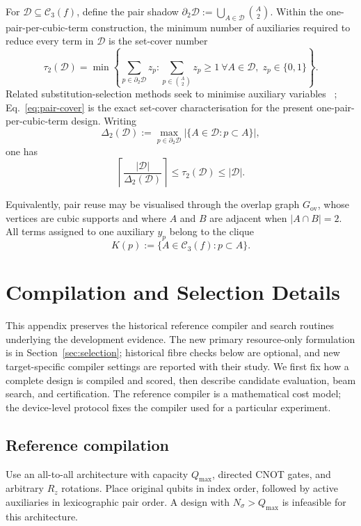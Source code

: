 \documentclass[a4paper,onecolumn,11pt,unpublished]{quantumarticle}
\theoremstyle{remark}
\begin{document}
For $\mathcal D\subseteq\mathcal C_3(f)$, define the pair shadow
\(
\partial_2\mathcal D
:=
\bigcup_{A\in\mathcal D}\binom{A}{2}.
\)
Within the one-pair-per-cubic-term construction, the minimum number of
auxiliaries required to reduce every term in $\mathcal D$ is the set-cover
number
\begin{equation}
\tau_2(\mathcal D)
=
\min
\left\{
\sum_{p\in\partial_2\mathcal D}z_p:
\sum_{p\in\binom{A}{2}}z_p\ge1\ \forall A\in\mathcal D,\;
z_p\in\{0,1\}
\right\}.
\label{eq:pair-cover}
\end{equation}
Related substitution-selection methods seek to minimise auxiliary variables
~\cite{VermaLewis2020,VermaLewisKochenberger2021,Schmidbauer2026};
Eq.~\eqref{eq:pair-cover} is the exact set-cover characterisation for the
present one-pair-per-cubic-term design.
Writing
\[
\Delta_2(\mathcal D)
:=
\max_{p\in\partial_2\mathcal D}
|\{A\in\mathcal D:p\subset A\}|,
\]
one has
\[
\left\lceil
\frac{|\mathcal D|}{\Delta_2(\mathcal D)}
\right\rceil
\le
\tau_2(\mathcal D)
\le
|\mathcal D|.
\]

Equivalently, pair reuse may be visualised through the overlap graph
$G_{\mathrm{ov}}$, whose vertices are cubic supports and where
$A$ and $B$ are adjacent when $|A\cap B|=2$. All terms assigned to one
auxiliary $y_p$ belong to the clique
\[
K(p):=\{A\in\mathcal C_3(f):p\subset A\}.
\]
\section{Compilation and Selection Details}
\label{app:certified-selection}

This appendix preserves the historical reference compiler and search routines
underlying the development evidence. The new primary resource-only formulation
is in Section~\ref{sec:selection}; historical fibre checks below are optional,
and new target-specific compiler settings are reported with their study.
We first fix how a complete design is compiled and scored, then describe
candidate evaluation, beam search, and certification.  The reference compiler
is a mathematical cost model; the device-level protocol fixes the compiler
used for a particular experiment.

\subsection{Reference compilation}
\label{app:reference-compiler}

Use an all-to-all architecture with capacity $Q_{\max}$, directed CNOT gates,
and arbitrary $R_z$ rotations.  Place original qubits in index order, followed
by active auxiliaries in lexicographic pair order.  A design with
$N_\sigma>Q_{\max}$ is infeasible for this architecture.
\end{document}
